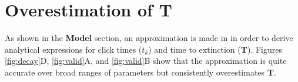 \documentclass[9pt,lineno]{elife}
\begin{document}
\begin{appendixbox}



\end{appendixbox}

\begin{appendixbox}


\label{app:jensen}
\section{Overestimation of \textbf{T}}
As shown in the \textbf{Model} section, an approximation is made in  in order to derive analytical expressions for click times ($t_k$) and time to extinction (\textbf{T}). 
Figures \ref{fig:decay}D, \ref{fig:valid}A, and \ref{fig:valid}B show that the approximation is quite accurate over broad ranges of parameters but consistently overestimates \textbf{T}.


\end{appendixbox}
\end{document}
